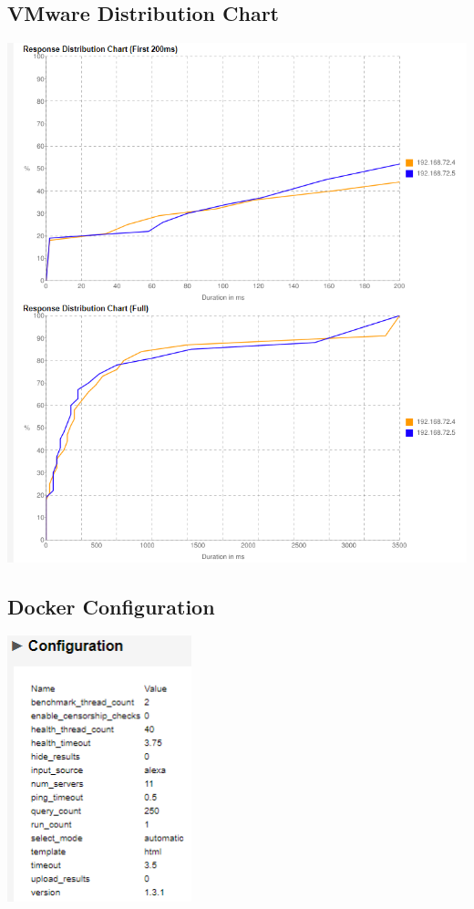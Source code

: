 \documentclass[12pt,twoside]{book}
\begin{document}
\subsection{VMware Distribution Chart}
\includegraphics[width=\textwidth]{Appendicies/VMwareTest3Chart.PNG}

\subsection{Docker Configuration}
\includegraphics[width=0.40\textwidth]{Appendicies/DockerTest3Config.PNG}
\end{document}
